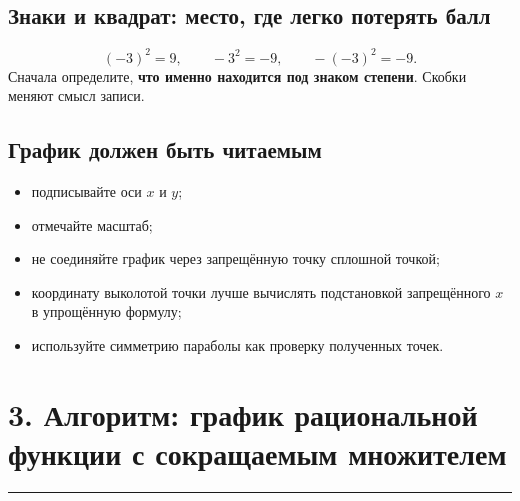 \documentclass[a4paper,12pt]{article}
\newcommand{\sectionrule}{\vspace{-0.4em}\noindent\color{rulegray}\rule{\linewidth}{0.6pt}\color{textgray}\vspace{0.4em}}
\newcommand{\key}[1]{\textcolor{darkaccent}{\textbf{#1}}}
\begin{document}
\subsection*{Знаки и квадрат: место, где легко потерять балл}
\[
  (-3)^2=9,\qquad -3^2=-9,\qquad -(-3)^2=-9.
\]
Сначала определите, \key{что именно находится под знаком степени}. Скобки меняют смысл записи.

\subsection*{График должен быть читаемым}
\begin{itemize}
  \item подписывайте оси $x$ и $y$;
  \item отмечайте масштаб;
  \item не соединяйте график через запрещённую точку сплошной точкой;
  \item координату выколотой точки лучше вычислять подстановкой запрещённого $x$ в упрощённую формулу;
  \item используйте симметрию параболы как проверку полученных точек.
\end{itemize}

\clearpage
\section*{3. Алгоритм: график рациональной функции с сокращаемым множителем}
\sectionrule
\end{document}
